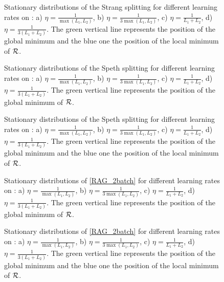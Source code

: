 \documentclass[article,authoryear,jmlmc]{beg_32}             %
\begin{document}
\begin{figure}[h!]
	\centering
	\scalebox{0.60}{}
	\caption{Stationary distributions of the Strang splitting for different learning rates on \exTwo: a) $\eta=\frac{1}{\max(L_1,L_2)}$, b) $\eta=\frac{1}{3\max(L_1,L_2)}$, c) $\eta=\frac{1}{L_1+L_2}$, d) $\eta=\frac{1}{3(L_1+L_2)}$. The green vertical line represents the position of the global minimum and the blue one the position of the local minimum of $\mathcal{R}$.}
	\label{Strang_ex2}
\end{figure} 

\begin{figure}[h!]
	\centering
	\scalebox{0.60}{}
	\caption{Stationary distributions of the Speth splitting for different learning rates on \exOne: a) $\eta=\frac{1}{\max(L_1,L_2)}$, b) $\eta=\frac{1}{3\max(L_1,L_2)}$, c) $\eta=\frac{1}{L_1+L_2}$, d) $\eta=\frac{1}{3(L_1+L_2)}$. The green vertical line represents the position of the global minimum of $\mathcal{R}$.}
	\label{speth_ex1}
\end{figure}

\begin{figure}[h!]
	\centering
	\scalebox{0.60}{}
	\caption{Stationary distributions of the Speth splitting for different learning rates on \exTwo: a) $\eta=\frac{1}{\max(L_1,L_2)}$, b) $\eta=\frac{1}{3\max(L_1,L_2)}$, c) $\eta=\frac{1}{L_1+L_2}$, d) $\eta=\frac{1}{3(L_1+L_2)}$. The green vertical line represents the position of the global minimum and the blue one the position of the local minimum of $\mathcal{R}$.}
	\label{speth_ex2}
\end{figure}

\begin{figure}[h!]
	\centering
	\scalebox{0.60}{}
	\caption{Stationary distributions of \eqref{RAG_2batch} for different learning rates on \exOne: a) $\eta=\frac{1}{\max(L_1,L_2)}$, b) $\eta=\frac{1}{3\max(L_1,L_2)}$, c) $\eta=\frac{1}{L_1+L_2}$, d) $\eta=\frac{1}{3(L_1+L_2)}$. The green vertical line represents the position of the global minimum of $\mathcal{R}$.}
	\label{IAG_ex1}
\end{figure}

\begin{figure}[h!]
	\centering
	\scalebox{0.60}{}
	\caption{Stationary distributions of \eqref{RAG_2batch} for different learning rates on \exTwo: a) $\eta=\frac{1}{\max(L_1,L_2)}$, b) $\eta=\frac{1}{3\max(L_1,L_2)}$, c) $\eta=\frac{1}{L_1+L_2}$, d) $\eta=\frac{1}{3(L_1+L_2)}$. The green vertical line represents the position of the global minimum and the blue one the position of the local minimum of $\mathcal{R}$.}
	\label{IAG_ex2}
\end{figure}
\end{document}

